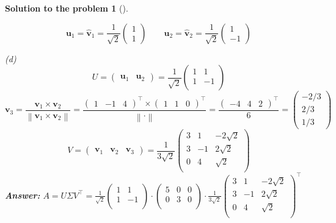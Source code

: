 \documentclass[12pt,a4]{article}
\newtheorem{solution}{Solution to the problem}
\newcommand{\bu}{{\mathbf u}}
\newcommand{\bv}{{\mathbf v}}
\newcommand{\norm}[1]{\left\lVert#1\right\rVert}
\newcommand{\answer}[1]{\textbf{Answer:} #1}
\begin{document}
\begin{solution}[]
\begin{enumerate}[(a)]
\[\]
\[
\bu_1 = \hat \bv_1 = \frac1{\sqrt2}
\begin{pmatrix} 1 \\ 1 \end{pmatrix} 
\qquad
\bu_2 = \hat \bv_2 = \frac1{\sqrt2}
\begin{pmatrix} 1 \\ -1  \end{pmatrix} 
\]
\end{enumerate}
	(d)
\[
U = \begin{pmatrix} \bu_1 & \bu_2 \end{pmatrix} 
 = \frac1{\sqrt2}
 \begin{pmatrix}
 1 & 1 \\
 1 & -1 \\
 \end{pmatrix} 
\]
\[
\bv_3 = \frac{\bv_1 \times \bv_2}{\norm{\bv_1 \times \bv_2}} =
\frac{\begin{pmatrix} 1 & -1 & 4 \end{pmatrix}^\top \times
\begin{pmatrix} 1 & 1 & 0 \end{pmatrix}^\top}{\norm{\cdot}} =
\frac{\begin{pmatrix} -4 & 4 & 2 \end{pmatrix}^\top}{6} =
\begin{pmatrix} -2/3 \\ 2/3 \\ 1/3 \end{pmatrix}
\]
\[
V = \begin{pmatrix} \bv_1 & \bv_2 & \bv_3 \end{pmatrix} 
= \frac1{3\sqrt2}
\begin{pmatrix}
3 & 1 & -2\sqrt2 \\
3 & -1 & 2\sqrt2 \\
0 & 4 & \sqrt2 \\
\end{pmatrix} 
\]
\answer{$
A = U\Sigma V^\top =
\frac1{\sqrt2}
\begin{pmatrix}
1 & 1 \\
1 & -1 \\
\end{pmatrix} 
\cdot
\begin{pmatrix}
5 & 0 & 0 \\
0 & 3 & 0 \\
\end{pmatrix} 
\cdot
\frac1{3\sqrt2}
\begin{pmatrix}
3 & 1 & -2\sqrt2 \\
3 & -1 & 2\sqrt2 \\
0 & 4 & \sqrt2 \\
\end{pmatrix} ^\top
$}\\[10pt]
\end{solution}
\end{document}
